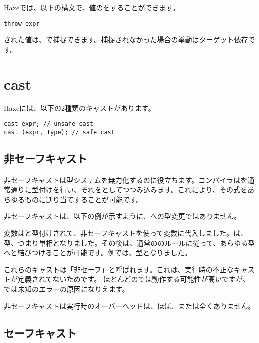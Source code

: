 Haxeでは、以下の構文で、値のをすることができます。

\begin{lstlisting}
throw expr
\end{lstlisting}

された値は、で捕捉できます。捕捉されなかった場合の挙動はターゲット依存です。

\section{cast}
\label{expression-cast}

Haxeには、以下の2種類のキャストがあります。

\begin{lstlisting}
cast expr; // unsafe cast
cast (expr, Type); // safe cast
\end{lstlisting}

\subsection{非セーフキャスト}
\label{expression-cast-unsafe}

非セーフキャストは型システムを無力化するのに役立ちます。コンパイラはを通常通りに型付けを行い、それをとしてつつみ込みます。これにより、その式をあらゆるものに割り当てすることが可能です。

非セーフキャストは、以下の例が示すように、への型変更ではありません。


変数はと型付けされて、非セーフキャストを使って変数に代入しました。は、型、つまり単相となりました。その後は、通常ののルールに従って、あらゆる型へと結びつけることが可能です。例では、型となりました。

これらのキャストは「非セーフ」と呼ばれます。これは、実行時の不正なキャストが定義されてないためです。 ほとんどのでは動作する可能性が高いですが、では未知のエラーの原因になりえます。

非セーフキャストは実行時のオーバーヘッドは、ほぼ、または全くありません。

\subsection{セーフキャスト}
\label{expression-cast-safe}

